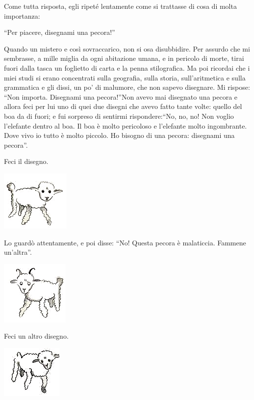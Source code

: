 \documentclass[11pt]{scrbook}
\begin{document}
Come tutta risposta, egli ripeté lentamente come si trattasse di cosa di molta importanza:

``Per piacere, disegnami una pecora!''

Quando un mistero e così sovraccarico, non si osa disubbidire. Per assurdo che mi sembrasse, a mille miglia da ogni abitazione umana, e in pericolo di morte, tirai fuori dalla tasca un foglietto di carta e la penna stilografica. Ma poi ricordai che i miei studi si erano concentrati sulla geografia, sulla storia, sull'aritmetica e sulla grammatica e gli dissi, un po' di malumore, che non sapevo disegnare. Mi rispose: ``Non importa. Disegnami una pecora!''Non avevo mai disegnato una pecora e allora feci per lui uno di quei due disegni che avevo fatto tante volte: quello del boa da di fuori; e fui sorpreso di sentirmi rispondere:``No, no, no! Non voglio l'elefante dentro al boa. Il boa è molto pericoloso e l'elefante molto ingombrante. Dove vivo io tutto è molto piccolo. Ho bisogno di una pecora: disegnami una pecora''.

Feci il disegno.

\begin{center}
\includegraphics{img/2b}
\end{center}

Lo guardò attentamente, e poi disse: ``No! Questa pecora è malaticcia. Fammene un'altra''.

\begin{center}
\includegraphics{img/2c}
\end{center}

Feci un altro disegno.

\begin{center}
\includegraphics{img/2d}
\end{center}
\end{document}
